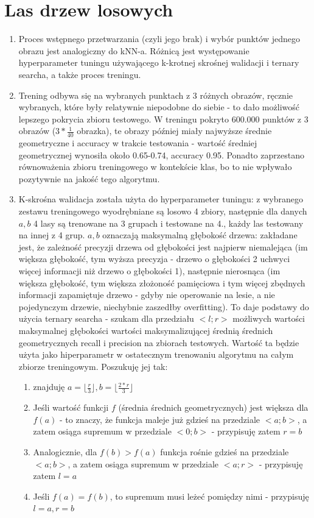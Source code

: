 \documentclass[12pt]{article}
\begin{document}
\section{Las drzew losowych}
\begin{enumerate}
	\item Proces wstępnego przetwarzania (czyli jego brak) i wybór punktów jednego obrazu jest analogiczny do kNN-a. Różnicą jest występowanie hyperparameter tuningu używającego k-krotnej skrośnej walidacji i ternary searcha, a także proces treningu.
	\item Trening odbywa się na wybranych punktach z 3 różnych obrazów, ręcznie wybranych, które były relatywnie niepodobne do siebie - to dało możliwość lepszego pokrycia zbioru testowego. W treningu pokryto 600.000 punktów z 3 obrazów (\(3*\frac{1}{40}\) obrazka), te obrazy później miały najwyższe średnie geometryczne i accuracy w trakcie testowania - wartość średniej geometrycznej wynosiła około 0.65-0.74, accuracy 0.95. Ponadto zaprzestano równoważenia zbioru treningowego w kontekście klas, bo to nie wpływało pozytywnie na jakość tego algorytmu.
	\item K-skrośna walidacja została użyta do hyperparameter tuningu: z wybranego zestawu treningowego wyodrębniane są losowo 4 zbiory, następnie dla danych \(a, b\) 4 lasy są trenowane na 3 grupach i testowane na 4., każdy las testowany na innej z 4 grup. \(a, b\) oznaczają maksymalną głębokość drzewa: zakładane jest, że zależność precyzji drzewa od głębokości jest najpierw niemalejąca (im większa głębokość, tym wyższa precyzja - drzewo o głębokości 2 uchwyci więcej informacji niż drzewo o głębokości 1), następnie nierosnąca (im większa głębokość, tym większa złożoność pamięciowa i tym więcej zbędnych informacji zapamiętuje drzewo - gdyby nie operowanie na lesie, a nie pojedynczym drzewie, niechybnie zaszedłby overfitting). To daje podstawy do użycia ternary searcha - szukam dla przedziału \(<l;r>\) możliwych wartości maksymalnej głębokości wartości maksymalizującej średnią średnich geometrycznych recall i precision na zbiorach testowych. Wartość ta będzie użyta jako hiperparametr w ostatecznym trenowaniu algorytmu na całym zbiorze treningowym. Poszukuję jej tak:
	\begin{enumerate}
		\item znajduję \(a=\lfloor\frac{r}{3}\rfloor, b=\lfloor\frac{2*r}{3}\rfloor\)
		\item Jeśli wartość funkcji \(f\) (średnia średnich geometrycznych) jest większa dla \(f(a)\) - to znaczy, że funkcja maleje już gdzieś na przedziale \(<a;b>\), a zatem osiąga supremum w przedziale \(<0;b>\) - przypisuję zatem \(r=b\)
		\item Analogicznie, dla \(f(b)>f(a)\) funkcja rośnie gdzieś na przedziale \(<a;b>\), a zatem osiąga supremum w przedziale \(<a;r>\) - przypisuję zatem \(l=a\)
		\item Jeśli \(f(a)=f(b)\), to supremum musi leżeć pomiędzy nimi - przypisuję \(l=a, r=b\)
	\end{enumerate}
\end{enumerate}
\end{document}
